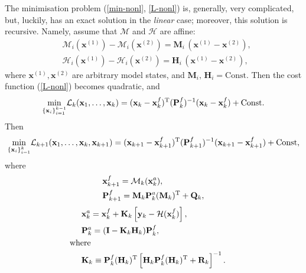 \documentclass[11pt]{report}
\newcommand{\mb} {\mathbf}
\newcommand{\T}{^{\tiny \mathrm T}}
\begin{document}
The minimisation problem (\ref{min-nonl}, \ref{L-nonl}) is, generally, very complicated, but, luckily, has an exact solution in the \emph{linear} case; moreover, this solution is recursive.
Namely, assume that $\mathcal M$ and $\mathcal H$ are affine:
\begin{subequations}
  \label{lin}
  \begin{align}
    \label{lin-M}
    &\mathcal M_i(\mb x^{(1)}) - \mathcal M_i(\mb x^{(2)}) = \mb M_i \, (\mb x^{(1)} - \mb x^{(2)}),\\
    \label{lin-H}
    &\mathcal H_i(\mb x^{(1)}) - \mathcal H_i(\mb x^{(2)}) = \mb H_i \, (\mb x^{(1)} - \mb x^{(2)}),
  \end{align}
\end{subequations}
where $\mb x^{(1)}, \mb x^{(2)}$ are arbitrary model states, and $\mb M_i,\, \mb H_i = \mathrm{Const}$.
Then the cost function (\ref{L-nonl}) becomes quadratic, and
\begin{align*}
  \underset {\{\mb x_i\}_{i = 1}^{k - 1}}{\min} \mathcal L_k(\mb x_1, \dots, \mb x_k) = (\mb x_k - \mb x_k^f)\T (\mb P_{k}^f)^{-1}(\mb x_k - \mb x_k^f) + \mathrm{Const}.
\end{align*}
Then
\begin{align*}
    \underset {\{\mb x_i\}_{i = 1}^{k}}{\min} \mathcal L_{k+1}(\mb x_1, \dots, \mb x_k, \mb x_{k+1}) = (\mb x_{k+1} - \mb x_{k+1}^f)\T (\mb P_{k+1}^f)^{-1}(\mb x_{k+1} - \mb x_{k+1}^f) + \mathrm{Const},
\end{align*}
where
\begin{subequations}
  \label{kf-for}
  \begin{align}
    \label{prop-x}
    & \mb x^f_{k+1} = \mathcal M_k(\mb x_k^a),\\
    \label{prop-P}
    & \mb P_{k+1}^f = \mb M_k \mb P_k^a (\mb M_k)\T + \mb Q_k,
  \end{align}
\end{subequations}
\vspace{-5mm}
\begin{subequations}
  \label{kf-an}
  \begin{align}
    \label{kf-an-x}
    & \mb x_k^a = \mb x_k^f + \mb K_k \left [\mb y_k - \mathcal H(\mb x_k^f) \right ],\\
    \label{kf-an-P}
    & \mb P_k^a = (\mb I - \mb K_k \mb H_k) \mb P_k^f,\\
    \nonumber
    & \hspace{-0.5cm} \text{where}\\
    \label{kf-K}
    & \mb K_k \equiv \mb P^f_k (\mb H_k)\T \left [\mb H_k \mb P_k^f (\mb H_k)\T + \mb R_k \right ]^{-1}.
  \end{align}
\end{subequations}
\end{document}
